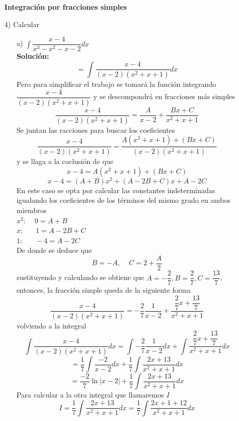 \documentclass[10pt,twoside]{SelfArx} %
\begin{document}
\begin{enumerate}
\begin{enumerate}
\textbf{Integración por fracciones simples}\\
\item[4)] Calcular
\begin{enumerate}
	\item[a)] $\displaystyle \int \dfrac{x-4}{x^{3}-x^{2}-x-2}dx $
\\	\textbf{Solución:}\\
	\begin{equation}
	=\int \dfrac{x-4}{(x-2)(x^{2}+x+1)}dx
	\end{equation}
	Pero para simplificar el trabajo se tomará la función integrando $ \dfrac{x-4}{(x-2)(x^{2}+x+1)} $ y se descompondrá en fracciones más simples
\[ 	\dfrac{x-4}{(x-2)(x^{2}+x+1)}= \dfrac{A}{x-2}+\dfrac{Bx+C}{x^{2}+x+1}\]
Se juntan las racciones para buscar los coeficientes
\[  	\dfrac{x-4}{(x-2)(x^{2}+x+1)}=\dfrac{A(x^{2}+x+1)+(Bx+C)}{(x-2)(x^{2}+x+1)} \]
y se llaga a la coclusi\'on de que
	\[ x-4=A(x^{2}+x+1)+(Bx+C) \]
	\[ x-4=(A+B)x^{2}+(A-2B+C)x+A-2C \]
	En este caso se opta por calcular las constantes indeterminadas igualando los coeficientes de los términos del mismo grado en ambos miembros\\
	$  x^{2}:\;\;\;\;0=A+B  $\\
$ 	 x:\;\;\;\;\;\;1=A-2B+C $ \\
$ 	 1:\;\;\;\;\;\;-4=A-2C  $\\
De donde se deduce que 
\[ B=-A, \;\;\;\; C=2+\dfrac{A}{2} \]
sustituyendo y calculando se obtiene que $ A=-\dfrac{2}{7} , B=\dfrac{2}{7}, C=\dfrac{13}{7}$, entonces, la fracción simple queda de la siguiente forma
\[ \dfrac{x-4}{(x-2)(x^{2}+x+1)}=-\dfrac{2}{7}\dfrac{1}{x-2}+\dfrac{\dfrac{2}{7}x+\dfrac{13}{7}}{x^{2}+x+1}  \]
volviendo a la integral
\begin{equation}
\int\dfrac{x-4}{(x-2)(x^{2}+x+1)}dx=\int-\dfrac{2}{7}\dfrac{1}{x-2}dx+\int\dfrac{\dfrac{2}{7}x+\dfrac{13}{7}}{x^{2}+x+1}dx
\end{equation}
\begin{equation}
=\dfrac{1}{7}\int\dfrac{-2}{x-2}dx+\dfrac{1}{7}\int\dfrac{2x+13}{x^{2}+x+1}dx
\end{equation}
\begin{equation}
=\dfrac{-2}{7}\ln|x-2|+\dfrac{1}{7}\int\dfrac{2x+13}{x^{2}+x+1}dx
\end{equation}
Para calcular a la otra integral que llamaremos $ I $
\begin{equation}
I=\dfrac{1}{7}\int\dfrac{2x+13}{x^{2}+x+1}dx=\dfrac{1}{7}\int\dfrac{2x+1+12}{x^{2}+x+1}dx
\end{equation}

\end{enumerate}
\end{enumerate}
\end{enumerate}
\end{document}
